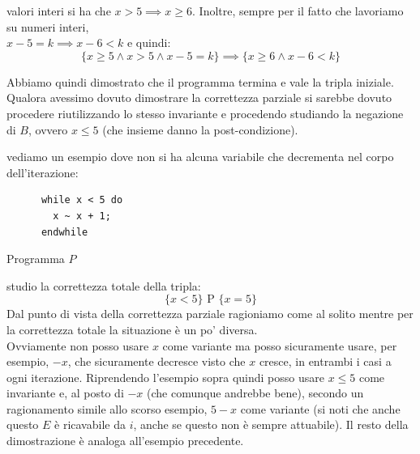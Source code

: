 \begin{esempio}
\begin{enumerate}
				      						      valori interi si ha che $x>5\implies x\geq 6$. Inoltre, sempre per il fatto
				      						      che lavoriamo su numeri interi, \\
				      						      $x-5=k\implies x-6<k$ e quindi:
				      						      \[\{x\geq 5\land x>5\land x-5=k\}\implies \{x\geq 6\land x-6 < k\}\]
				      					\end{enumerate}
				      					Abbiamo quindi dimostrato che il programma termina e vale la tripla
				      					iniziale.\\
				      					Qualora avessimo dovuto dimostrare la correttezza parziale si sarebbe dovuto
				      					procedere riutilizzando lo stesso invariante e procedendo studiando la
				      					negazione di $B$, ovvero $x\leq 5$ (che insieme danno la post-condizione).
				      				\end{esempio}
				      				\begin{esempio}
				      					vediamo un esempio dove non si ha alcuna variabile che decrementa nel corpo
				      					dell'iterazione:
				      					\begin{listing}[H]
				      						\begin{lstlisting}
      while x < 5 do
        x ~ x + 1;
      endwhile  
				      						\end{lstlisting}
				      						\caption{Programma $P$}
				      						\label{E:ti}
				      					\end{listing}
				      					studio la correttezza totale della tripla:
				      					\[\{x<5\}\mbox{ P }\{x=5\}\]
				      					Dal punto di vista della correttezza parziale ragioniamo come al solito mentre
				      					per la correttezza totale la situazione è un po' diversa.\\
				      					Ovviamente non posso usare $x$ come variante ma posso sicuramente usare, per
				      					esempio, $-x$, che sicuramente decresce visto che $x$ cresce, in entrambi i
				      					casi a ogni iterazione. Riprendendo l'esempio sopra quindi posso usare $x\leq
				      					5$ come invariante e, al posto di $-x$ (che comunque andrebbe bene), secondo un
				      					ragionamento simile allo scorso esempio, $5-x$ come variante (si noti che
				      					anche questo $E$ è ricavabile da $i$, anche se questo non è sempre attuabile).
				      					Il resto della dimostrazione è analoga all'esempio precedente.
				      				\end{esempio}
